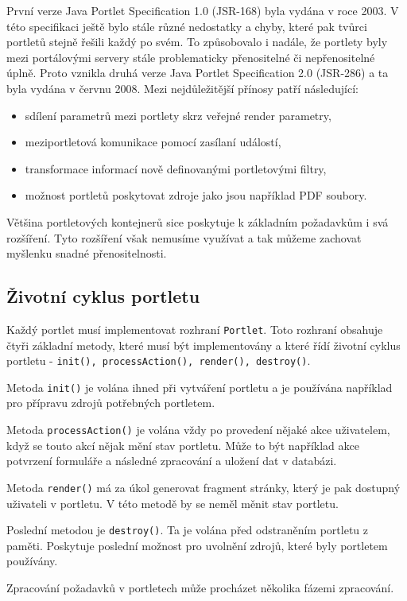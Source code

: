 \documentclass{fithesis}
\begin{document}
První verze Java Portlet Specification 1.0 (JSR-168) byla vydána v roce 2003. V této specifikaci ještě bylo stále různé nedostatky a chyby, které pak tvůrci portletů stejně řešili každý po svém. To způsobovalo i nadále, že portlety byly mezi portálovými servery stále problematicky přenositelné či nepřenositelné úplně. Proto vznikla druhá verze Java Portlet Specification 2.0 (JSR-286) a ta byla vydána v červnu 2008. Mezi nejdůležitější přínosy patří následující:
\begin{itemize}
\item sdílení parametrů mezi portlety skrz veřejné render parametry,
\item meziportletová komunikace pomocí zasílaní událostí,
\item transformace informací nově definovanými portletovými filtry,
\item možnost portletů poskytovat zdroje jako jsou například PDF soubory.
\end{itemize}
Většina portletových kontejnerů sice poskytuje k základním požadavkům i svá rozšíření. Tyto rozšíření však nemusíme využívat a tak můžeme zachovat myšlenku snadné přenositelnosti.

\subsection{Životní cyklus portletu}
Každý portlet musí implementovat rozhraní \verb|Portlet|. Toto rozhraní obsahuje čtyři základní metody, které musí být implementovány a které řídí životní cyklus portletu - \verb|init(), processAction(), render(), destroy()|.

Metoda \verb|init()| je volána ihned při vytváření portletu a je používána například pro přípravu zdrojů potřebných portletem.

Metoda \verb|processAction()| je volána vždy po provedení nějaké akce uživatelem, když se touto akcí nějak mění stav portletu. Může to být například akce potvrzení formuláře a následné zpracování a uložení dat v databázi.

Metoda \verb|render()| má za úkol generovat fragment stránky, který je pak dostupný uživateli v portletu. V této metodě by se neměl měnit stav portletu.

Poslední metodou je \verb|destroy()|. Ta je volána před odstraněním portletu z paměti. Poskytuje poslední možnost pro uvolnění zdrojů, které byly portletem používány. \cite{jsr-286}

Zpracování požadavků v portletech může procházet několika fázemi zpracování.
\end{document}
